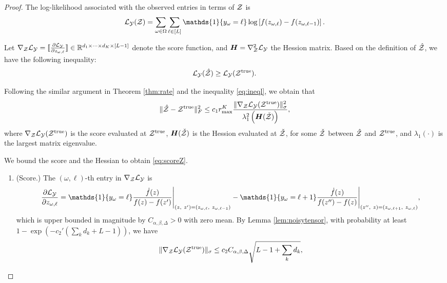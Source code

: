 \documentclass{article}
\theoremstyle{plain}
\theoremstyle{definition}
\begin{document}
\begin{proof} 
The log-likelihood associated with the observed entries in terms of $\mathcal{Z}$ is
\begin{equation}\label{eq:loglz}
\flogl(\tZ) = \sum_{\omega\in\Omega}\sum_{\ell\in[L]}\mathds{1}\{y_\omega=\ell\}\log\left[f(z_{\omega,\ell})-f(z_{\omega,\ell-1})\right].
\end{equation}

Let $\nabla_{\mathcal{Z}}\mathcal{L}_{\mathcal{Y}}=\llbracket {\partial \mathcal{L}_{\mathcal{Y}}\over \partial z_{\omega,\ell}} \rrbracket\in\mathbb{R}^{d_1\times \cdots \times d_K\times[L-1]}$ denote the score function, and $\bm{H}=\nabla^2_{\mathcal{Z}}\mathcal{L}_{\mathcal{Y}}$ the Hession matrix. 
Based on the definition of $\hat{\mathcal{Z}}$, we have the following inequality:
\begin{equation}\label{eq:ineql}
\mathcal{L}_{\mathcal{Y}}(\hat{\mathcal{Z}}) \geq \mathcal{L}_{\mathcal{Y}}(\mathcal{Z}^{\mathrm{true}}).
\end{equation}

Following the similar argument in Theorem \ref{thm:rate} and the inequality \eqref{eq:ineql}, we obtain that
\begin{equation}\label{eq:boundZ}
\lVert\hat {\mathcal{Z}}-\mathcal{Z}^{\mathrm{true}}\rVert_F^2 \leq c_1r^{K}_{\max}{\lVert\nabla_{\mathcal{Z}}\mathcal{L}_{\mathcal{Y}}(\mathcal{Z}^{\mathrm{true}})\rVert_\sigma^2\over \lambda^2_{1} \left(\bm{H}(\check{\mathcal{Z}})\right)},
\end{equation}
where $\nabla_{\mathcal{Z}}\mathcal{L}_{\mathcal{Y}}(\mathcal{Z}^{\mathrm{true}})$ is the score evaluated at $\mathcal{Z}^{\mathrm{true}}$, $\bm{H}(\check {\mathcal{Z}})$ is the Hession evaluated at $\check{\mathcal{Z}}$, for some $\check{\mathcal{Z}}$ between $\hat {\mathcal{Z}}$ and $\mathcal{Z}^{\mathrm{true}}$,  and $\lambda_{1}(\cdot)$ is the largest matrix eigenvalue. 

We bound the score and the Hessian to obtain \eqref{eq:scoreZ}.

\begin{enumerate}
\item (Score.) The $(\omega,\ell)$-th entry in $\nabla_{\mathcal{Z}}\mathcal{L}_{\mathcal{Y}}$ is 
\[
{\partial \tL_\tY\over \partial z_{\omega,\ell}}=\mathds{1}\{y_\omega=\ell\}{\dot{f}(z)\over f(z)-f(z')}\Bigg|_{(z,\ z')=(z_{\omega,\ell},\ z_{\omega,\ell-1})} - \mathds{1}\{y_\omega=\ell+1\}{\dot{f}(z)\over f(z'')-f(z)}\Bigg|_{(z'',\ z)=(z_{\omega,\ell+1},\ z_{\omega,\ell})},
\]
which is upper bounded in magnitude by $C_{\alpha,\beta,\Delta}>0$ with zero mean. By Lemma \ref{lem:noisytensor}, with probability at least $1-\exp\left(-c_2'
\left(\sum_k d_k+ L-1\right)\right)$, we have
\begin{align}\label{eq:scorebound}
\lVert\nabla_{\mathcal{Z}}\mathcal{L}_{\mathcal{Y}}(\mathcal{Z}^{\mathrm{true}})\rVert_\sigma\leq c_2C_{\alpha,\beta,\Delta}\sqrt{L-1+\sum_k d_k},
\end{align}


\end{enumerate}
\end{proof}
\end{document}
